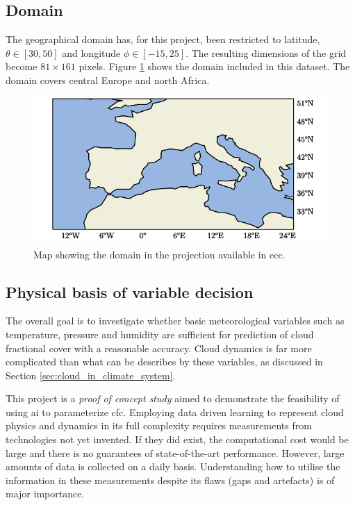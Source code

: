 \subsection{Domain}
The geographical domain has, for this project, been restricted to latitude, $\theta \in[30,50]$ and longitude $\phi \in [-15, 25]$. The resulting dimensions of the grid become $81\times161$ pixels. Figure \ref{fig:map} shows the domain included in this dataset. The domain covers central Europe and north Africa.
\begin{figure}[h]
    \centering
    \includegraphics[scale = 1.0]{python_figs/Domain.png}
    \caption[Map over domain.]{Map showing the domain in the projection available in \acrshort{ecc}.}
    \label{fig:map}
\end{figure}

\subsection{Physical basis of variable decision} \label{sec:ecc}
The overall goal is to investigate whether basic meteorological variables such as temperature, pressure and humidity are sufficient for prediction of cloud fractional cover with a reasonable accuracy. Cloud dynamics is far more complicated than what can be describes by these variables, as discussed in Section \ref{sec:cloud_in_climate_system}.

This project is a \textit{proof of concept study} aimed to demonstrate the feasibility of using \acrshort{ai} to parameterize \acrshort{cfc}. Employing data driven learning to represent cloud physics and dynamics in its full complexity requires measurements from technologies not yet invented. If they did exist, the computational cost would be large and there is no guarantees of state-of-the-art performance. However, large amounts of data is collected on a daily basis. Understanding how to utilise the information in these measurements despite its flaws (gaps and artefacts) is of major importance. 

